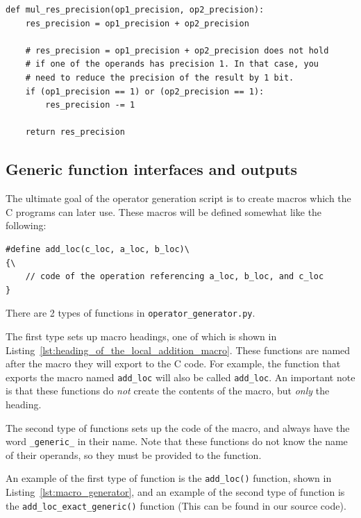 \documentclass[12pt, a4paper]{report}
\begin{document}
\begin{sloppypar}
\begin{lstlisting}
def mul_res_precision(op1_precision, op2_precision):
    res_precision = op1_precision + op2_precision

    # res_precision = op1_precision + op2_precision does not hold
    # if one of the operands has precision 1. In that case, you
    # need to reduce the precision of the result by 1 bit.
    if (op1_precision == 1) or (op2_precision == 1):
        res_precision -= 1

    return res_precision
\end{lstlisting}

\subsection{Generic function interfaces and outputs}
The ultimate goal of the operator generation script is to create macros which
the C programs can later use. These macros will be defined somewhat like the
following:

\begin{lstlisting}
#define add_loc(c_loc, a_loc, b_loc)\
{\
    // code of the operation referencing a_loc, b_loc, and c_loc
}
\end{lstlisting}

There are 2 types of functions in \verb+operator_generator.py+.

The first type sets up macro headings, one of which is shown in
Listing~\ref{lst:heading_of_the_local_addition_macro}.
These functions are named after the macro they will export to the C code.
For example, the function that exports the macro named \verb+add_loc+ will also
be called \verb+add_loc+.
An important note is that these functions do \emph{not} create the contents of
the macro, but \emph{only} the heading.

The second type of functions sets up the code of the macro, and always have the
word \verb+_generic_+ in their name.
Note that these functions do not know the name of their operands, so they must
be provided to the function.

An example of the first type of function is the \verb+add_loc()+ function, shown
in Listing~\ref{lst:macro_generator}, and an example of the second type of
function is the \verb+add_loc_exact_generic()+ function (This can be found in
our source code).


\end{sloppypar}
\end{document}
